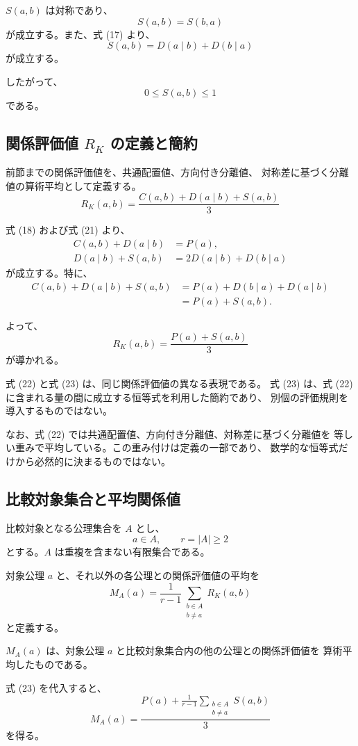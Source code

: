 \documentclass[a4paper,11pt]{ltjsarticle}
\begin{document}
$S(a,b)$ は対称であり、
\[
S(a,b)=S(b,a)
\]
が成立する。また、式 (17) より、
\[
\boxed{
S(a,b)=D(a\mid b)+D(b\mid a)
}
\tag{21}
\]
が成立する。

したがって、
\[
0\leq S(a,b)\leq 1
\]
である。

\subsection{関係評価値 $R_K$ の定義と簡約}

前節までの関係評価値を、共通配置値、方向付き分離値、
対称差に基づく分離値の算術平均として定義する。
\[
\boxed{
R_K(a,b)=
\frac{C(a,b)+D(a\mid b)+S(a,b)}{3}
}
\tag{22}
\]

式 (18) および式 (21) より、
\[
\begin{aligned}
C(a,b)+D(a\mid b)&=P(a),\\
D(a\mid b)+S(a,b)
&=2D(a\mid b)+D(b\mid a)
\end{aligned}
\]
が成立する。特に、
\[
\begin{aligned}
C(a,b)+D(a\mid b)+S(a,b)
&=P(a)+D(b\mid a)+D(a\mid b)\\
&=P(a)+S(a,b).
\end{aligned}
\]

よって、
\[
\boxed{
R_K(a,b)=\frac{P(a)+S(a,b)}{3}
}
\tag{23}
\]
が導かれる。

式 (22) と式 (23) は、同じ関係評価値の異なる表現である。
式 (23) は、式 (22) に含まれる量の間に成立する恒等式を利用した簡約であり、
別個の評価規則を導入するものではない。

なお、式 (22) では共通配置値、方向付き分離値、対称差に基づく分離値を
等しい重みで平均している。この重み付けは定義の一部であり、
数学的な恒等式だけから必然的に決まるものではない。

\subsection{比較対象集合と平均関係値}

比較対象となる公理集合を $A$ とし、
\[
a\in A,\qquad r=|A|\geq 2
\]
とする。$A$ は重複を含まない有限集合である。

対象公理 $a$ と、それ以外の各公理との関係評価値の平均を
\[
\boxed{
M_A(a)=
\frac{1}{r-1}
\sum_{\substack{b\in A\\b\ne a}}R_K(a,b)
}
\tag{24}
\]
と定義する。

$M_A(a)$ は、対象公理 $a$ と比較対象集合内の他の公理との関係評価値を
算術平均したものである。

式 (23) を代入すると、
\[
\boxed{
M_A(a)=
\frac{P(a)+
\displaystyle\frac{1}{r-1}
\sum_{\substack{b\in A\\b\ne a}}S(a,b)}
{3}
}
\tag{25}
\]
を得る。
\end{document}
